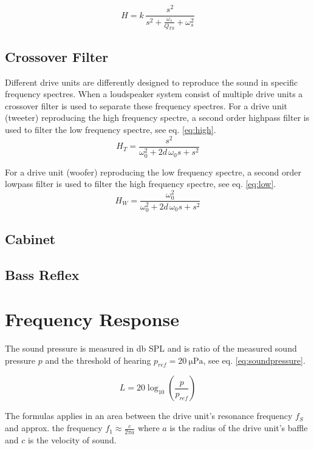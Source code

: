 \begin{equation}
H = k\,\dfrac{s^2}{s^2+\frac{\omega_s}{Q_{TS}}+\omega_s^2}
\label{eq:dutfderived}
\end{equation}

\subsection{Crossover Filter}
Different drive units are differently designed to reproduce the sound in specific frequency spectres.
When a loudspeaker system consist of multiple drive units a crossover filter is used to separate these frequency spectres.
For a drive unit (tweeter) reproducing the high frequency spectre, a second order highpass filter is used to filter the low frequency spectre, see eq. \ref{eq:high}.
\begin{equation}
H_{T} = \frac{s^2}{\omega_0^2+2d\,\omega_0 s+s^2}
\label{eq:high}
\end{equation}

For a drive unit (woofer) reproducing the low frequency spectre, a second order lowpass filter is used to filter the high frequency spectre, see eq. \ref{eq:low}.
\begin{equation}
H_{W} = \frac{\omega_0^2}{\omega_0^2+2d\,\omega_0 s+s^2}
\label{eq:low}
\end{equation}

\subsection{Cabinet}

\subsection{Bass Reflex}

\section{Frequency Response}
The sound pressure is measured in \si{\decibel} SPL and is ratio of the measured sound pressure $p$ and the threshold of hearing $p_{ref}=\SI{20}{\micro\pascal}$, see eq. \ref{eq:soundpressure}.

\begin{equation}
L=20\log_{10}\left(\frac{p}{p_{ref}}\right)
\label{eq:soundpressure}
\end{equation}

The formulas applies in an area between the drive unit's resonance frequency $f_S$ and approx. the frequency $f_1\approx\frac{c}{2\pi a}$ where $a$ is the radius of the drive unit's baffle and $c$ is the velocity of sound. \cite[p.~41]{Elektroakustik}

